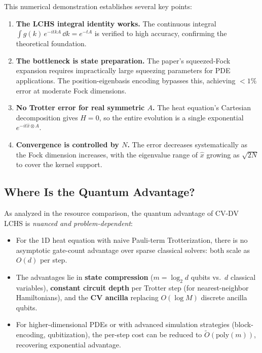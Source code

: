 \documentclass[11pt]{article}
\begin{document}
This numerical demonstration establishes several key points:

\begin{enumerate}
  \item \textbf{The LCHS integral identity works.}  The continuous integral
        $\int g(k)\,e^{-itkA}\,\dd{k} = e^{-tA}$ is verified to high
        accuracy, confirming the theoretical foundation.

  \item \textbf{The bottleneck is state preparation.}  The paper's
        squeezed-Fock expansion requires impractically large squeezing
        parameters for PDE applications.  The position-eigenbasis encoding
        bypasses this, achieving $< 1\%$ error at moderate Fock dimensions.

  \item \textbf{No Trotter error for real symmetric $A$.}  The heat equation's
        Cartesian decomposition gives $H=0$, so the entire evolution is a
        single exponential $e^{-it\hat{x}\otimes A}$.

  \item \textbf{Convergence is controlled by $N$.}  The error decreases
        systematically as the Fock dimension increases, with the
        eigenvalue range of $\hat{x}$ growing as $\sqrt{2N}$ to cover
        the kernel support.
\end{enumerate}

\subsection{Where Is the Quantum Advantage?}

As analyzed in the resource comparison, the quantum advantage of
CV-DV LCHS is \emph{nuanced and problem-dependent}:

\begin{itemize}
  \item For the 1D heat equation with naive Pauli-term Trotterization,
        there is no asymptotic gate-count advantage over sparse classical
        solvers: both scale as $O(d)$ per step.
  \item The advantages lie in \textbf{state compression}
        ($m = \log_2 d$ qubits vs.\ $d$ classical variables),
        \textbf{constant circuit depth} per Trotter step (for
        nearest-neighbor Hamiltonians), and the \textbf{CV ancilla}
        replacing $O(\log M)$ discrete ancilla qubits.
  \item For higher-dimensional PDEs or with advanced simulation
        strategies (block-encoding, qubitization), the per-step cost can
        be reduced to $\tilde{O}(\mathrm{poly}(m))$, recovering exponential
        advantage.
\end{itemize}
\end{document}
